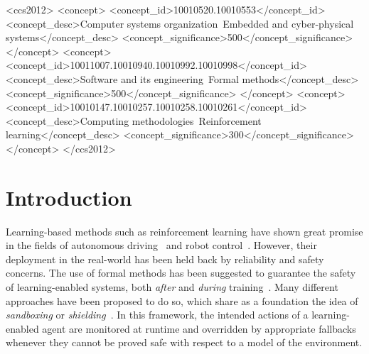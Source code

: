 \documentclass[acmsmall,screen,nonacm]{acmart}
\begin{document}
\begin{CCSXML}
  <ccs2012>
     <concept>
         <concept_id>10010520.10010553</concept_id>
         <concept_desc>Computer systems organization~Embedded and cyber-physical systems</concept_desc>
         <concept_significance>500</concept_significance>
         </concept>
     <concept>
         <concept_id>10011007.10010940.10010992.10010998</concept_id>
         <concept_desc>Software and its engineering~Formal methods</concept_desc>
         <concept_significance>500</concept_significance>
         </concept>
     <concept>
         <concept_id>10010147.10010257.10010258.10010261</concept_id>
         <concept_desc>Computing methodologies~Reinforcement learning</concept_desc>
         <concept_significance>300</concept_significance>
         </concept>
   </ccs2012>
\end{CCSXML}



\maketitle

\section{Introduction}

Learning-based methods such as reinforcement learning have shown great promise in the fields of autonomous driving~\cite{DBLP:journals/corr/Shalev-ShwartzS16a,DBLP:conf/eccv/LiangWYX18} and robot control~\cite{DBLP:journals/jirs/RovedaMFABTP20,DBLP:conf/icra/HesterQS12,DBLP:conf/icra/SmartK02}. However, their deployment in the real-world has been held back by reliability and safety concerns. The use of formal methods has been suggested to guarantee the safety of learning-enabled systems, both \emph{after} and \emph{during} training~\cite{DBLP:conf/aaai/FultonP18,DBLP:conf/tacas/FultonP19,DBLP:conf/atal/Elsayed-AlyBAET21,DBLP:conf/hybrid/HuntFMHDS21}. Many different approaches have been proposed to do so, which share as a foundation the idea of \emph{sandboxing} or \emph{shielding}~\cite{DBLP:journals/fmsd/MitschP16,DBLP:conf/aaai/AlshiekhBEKNT18,DBLP:conf/aaai/FultonP18,DBLP:conf/icra/ThummA22}. In this framework, the intended actions of a learning-enabled agent are monitored at runtime and overridden by appropriate fallbacks whenever they cannot be proved safe with respect to a model of the environment.
\end{document}
